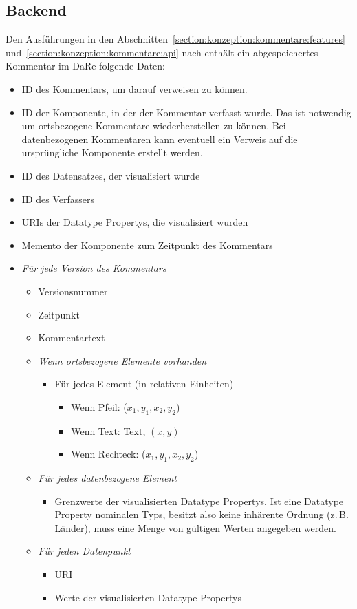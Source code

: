 \documentclass[
	headsepline,
	footsepline,
	fontsize=12pt,
	bibliography=totoc
]{scrbook}
\begin{document}
\subsection{Backend}
\label{section:konzeption:kommentare:backend}



Den Ausführungen in den Abschnitten~\ref{section:konzeption:kommentare:features} und~\ref{section:konzeption:kommentare:api} nach enthält ein abgespeichertes Kommentar im DaRe folgende Daten:

\begin{itemize}
	\item ID des Kommentars, um darauf verweisen zu können.
	\item ID der Komponente, in der der Kommentar verfasst wurde. Das ist notwendig um ortsbezogene Kommentare wiederherstellen zu können. Bei datenbezogenen Kommentaren kann eventuell ein Verweis auf die ursprüngliche Komponente erstellt werden.
	\item ID des Datensatzes, der visualisiert wurde
	\item ID des Verfassers
	\item URIs der Datatype Propertys, die visualisiert wurden
	\item Memento der Komponente zum Zeitpunkt des Kommentars
	\item \textit{Für jede Version des Kommentars}
	\begin{itemize}
		\item Versionsnummer
		\item Zeitpunkt
		\item Kommentartext
		\item \textit{Wenn ortsbezogene Elemente vorhanden}
		\begin{itemize}
			\item Für jedes Element (in relativen Einheiten)
			\begin{itemize}
				\item Wenn Pfeil: ($x_1,y_1,x_2,y_2$)
				\item Wenn Text: Text, $(x,y)$
				\item Wenn Rechteck: ($x_1,y_1,x_2,y_2$)
			\end{itemize}
		\end{itemize}
	\item \textit{Für jedes datenbezogene Element}
		\begin{itemize}
			\item Grenzwerte der visualisierten Datatype Propertys. Ist eine Datatype Property nominalen Typs, besitzt also keine inhärente Ordnung (z.\,B. Länder), muss eine Menge von gültigen Werten angegeben werden.
		\end{itemize}
	\item \textit{Für jeden Datenpunkt}
		\begin{itemize}
			\item URI
			\item Werte der visualisierten Datatype Propertys
		\end{itemize}
	\end{itemize}
\end{itemize}
\end{document}
